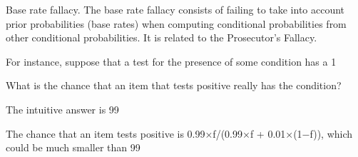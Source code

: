 Base rate fallacy.
The base rate fallacy consists of failing to take into account prior probabilities (base rates) when computing conditional probabilities from other conditional probabilities. It is related to the Prosecutor's Fallacy.
 
For instance, suppose that a test for the presence of some condition has a 1%
 
What is the chance that an item that tests positive really has the condition?
 
The intuitive answer is 99%
 
The chance that an item tests positive is 0.99×f/(0.99×f + 0.01×(1−f)), which could be much smaller than 99%
